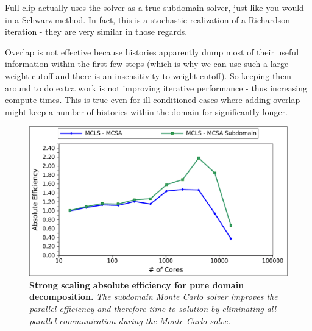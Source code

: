 Full-clip actually uses the solver as a true subdomain solver, just
like you would in a Schwarz method. In fact, this is a stochastic
realization of a Richardson iteration - they are very similar in those
regards.

Overlap is not effective because histories apparently dump most of
their useful information within the first few steps (which is why we
can use such a large weight cutoff and there is an insensitivity to
weight cutoff). So keeping them around to do extra work is not
improving iterative performance - thus increasing compute times. This
is true even for ill-conditioned cases where adding overlap might keep
a number of histories within the domain for significantly longer.

\begin{figure}[t!]
  \begin{center}
    \includegraphics[width=6in]{chapters/parallel_mc/titan_strong_subdomain.pdf}
  \end{center}
  \caption{\textbf{Strong scaling absolute efficiency for pure domain
      decomposition.} \textit{The subdomain Monte Carlo solver
      improves the parallel efficiency and therefore time to solution
      by eliminating all parallel communication during the Monte Carlo
      solve.}}
  \label{fig:titan_strong_subdomain}
\end{figure}

